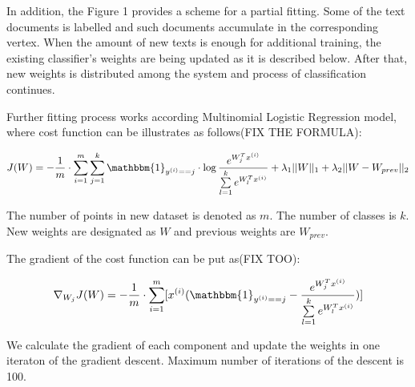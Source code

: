 In addition, the Figure 1 provides a scheme for a partial fitting. Some of the text documents is labelled and such documents accumulate in the corresponding vertex. When the amount of new texts is enough for additional training, the existing classifier's weights are being updated as it is described below. After that, new weights is distributed among the system and process of classification continues. 

Further fitting process works according Multinomial Logistic Regression model, where cost function can be illustrates as follows(FIX THE FORMULA):

$$J(W) = -\frac{1}{m} \cdot \sum \limits_{i = 1}^{m} \sum \limits_{j = 1}^{k} \mathbbm{1}_{y^{(i)} == j} \cdot \log \frac{e^{W_{j}^Tx^{(i)}}}{\sum \limits_{l = 1}^{k}  e^{W_{l}^Tx^{(i)}}} + \lambda_1 ||W||_1 + \lambda_2 ||W - W_{prev}||_2 $$

The number of points in new dataset is denoted as $m$. The number of classes is $k$. New weights are designated as $W$ and previous weights are $W_{prev}$.

The gradient of the cost function can be put as(FIX TOO):

$$ \nabla_{W_j} J(W) = -\frac{1}{m} \cdot \sum \limits_{i = 1}^{m} [ x^{(i)} ( \mathbbm{1}_{y^{(i)} == j} - \frac{e^{W_{j}^Tx^{(i)}}}{\sum \limits_{l = 1}^{k}  e^{W_{l}^Tx^{(i)}}} ) ] $$

We calculate the gradient of each component and update the weights in one iteraton of the gradient descent. Maximum number of iterations of the descent is 100.